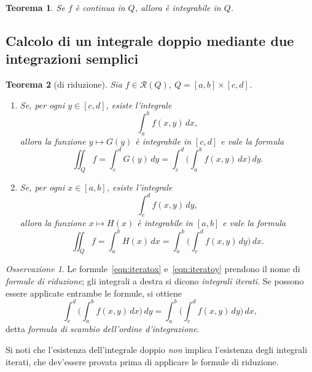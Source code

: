 \documentclass[a4paper]{book}
\numberwithin{equation}{section}
\theoremstyle{plain}
\newtheorem{teor}{Teorema}[section]
\theoremstyle{definition}
\theoremstyle{remark}
\newtheorem{oss}{Osservazione}[section]
\theoremstyle{example}
\begin{document}
		\begin{teor}
			Se $f$ è continua in $Q$, allora è integrabile in $Q$.
		\end{teor}
		\subsection{Calcolo di un integrale doppio mediante due integrazioni semplici}
		\begin{teor}[di riduzione]
			Sia $f \in \mathcal{R}(Q)$, $Q = [a, b] \times [c, d]$.
			\begin{enumerate}
				\item Se, per ogni $y \in [c, d]$, esiste l'integrale
				\begin{equation*}
					\int_a^b f(x, y) \, dx,
				\end{equation*}
				allora la funzione $y \mapsto G(y)$ è integrabile in $[c, d]$ e vale la formula
				\begin{equation}
					\label{eqn:iteratox}
					\iint_Q f = \int_c^d G(y)\, dy = \int_c^d \biggl( \int_a^b f(x, y) \, dx \biggr) \, dy.
				\end{equation}

				\item Se, per ogni $x \in [a, b]$, esiste l'integrale
				\begin{equation*}
					\int_c^d f(x,y) \, dy,
				\end{equation*}
				allora la funzione $x \mapsto H(x)$ è integrabile in $[a, b]$ e vale la formula
				\begin{equation}
					\label{eqn:iteratoy}
					\iint_Q f = \int_a^b H(x) \, dx = \int_a^b \biggl( \int_c^d f(x,y) \, dy \biggr) \, dx.
				\end{equation}
			\end{enumerate}
		\end{teor}

		\begin{oss}
			Le formule~\eqref{eqn:iteratox} e~\eqref{eqn:iteratoy} prendono il nome di \emph{formule di riduzione}; gli integrali a destra si dicono \emph{integrali iterati}. Se possono essere applicate entrambe le formule, si ottiene
			\begin{equation}
				\int_c^d \biggl( \int_a^b f(x,y) \, dx \biggr) \, dy = \int_a^b \biggl( \int_c^d f(x,y) \,dy \biggr) \, dx,
			\end{equation}
			detta \emph{formula di scambio dell'ordine d'integrazione}.
		\end{oss}

		Si noti che l'esistenza dell'integrale doppio \emph{non} implica l'esistenza degli integrali iterati, che dev'essere provata prima di applicare le formule di riduzione.
\end{document}
